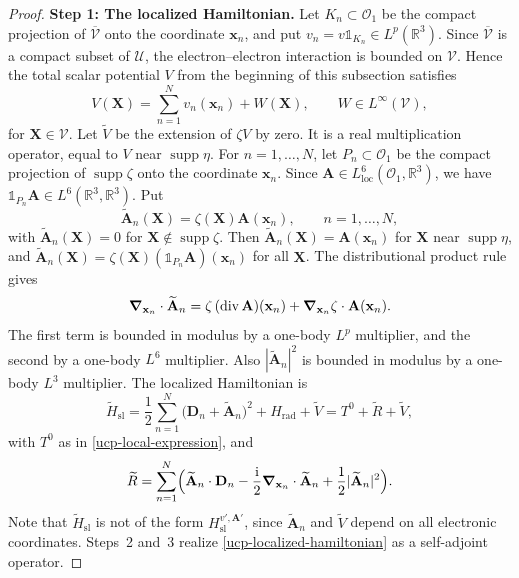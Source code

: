 \documentclass[final,reqno]{amsart}
\DeclareMathOperator{\div}{div}
\DeclareMathOperator{\supp}{supp}
\theoremstyle{remark}
\newcommand{\RR}{\mathbb{R}}
\newcommand{\iden}{\mathbb{1}}
\renewcommand{\i}{\mathrm{i}}
\newcommand{\ol}[1]{\overline{#1}}
\newcommand{\rad}{\mathrm{rad}}
\newcommand{\vx}{\mathbf{x}}
\newcommand{\vA}{{\mathbf{A}}}
\newcommand{\vX}{{\mathbf{X}}}
\newcommand{\vD}{{\mathbf{D}}}
\begin{document}
\begin{proof}
\noindent\textbf{Step 1: The localized Hamiltonian.}
Let $K_n\subset\mathcal O_1$ be the compact projection of
$\ol{\mathcal V}$ onto the coordinate $\vx_n$, and put
$v_n=v\iden_{K_n}\in L^p(\RR^3)$.  Since $\ol{\mathcal V}$ is a compact
subset of $\mathcal U$, the electron--electron interaction is bounded
on $\mathcal V$.  Hence the total scalar potential $V$ from the
beginning of this subsection satisfies
\begin{equation*}
 V(\vX)=\sum_{n=1}^N v_n(\vx_n)+W(\vX),\qquad
 W\in L^\infty(\mathcal V),
\end{equation*}
for $\vX\in\mathcal V$.  Let $\widetilde V$ be the extension of
$\zeta V$ by zero.  It is a real multiplication operator, equal to $V$
near $\supp\eta$.  For
$n=1,\ldots,N$, let $P_n\subset\mathcal O_1$ be the compact projection
of $\supp\zeta$ onto the coordinate $\vx_n$.  Since
$\vA\in L^6_\mathrm{loc}(\mathcal O_1,\RR^3)$, we have
$\iden_{P_n}\vA\in L^6(\RR^3,\RR^3)$.  Put
\[
 \widetilde\vA_n(\vX)=\zeta(\vX)\vA(\vx_n),\qquad n=1,\ldots,N,
\]
with $\widetilde\vA_n(\vX)=0$ for $\vX\notin\supp\zeta$.  Then
$\widetilde\vA_n(\vX)=\vA(\vx_n)$ for $\vX$ near $\supp\eta$, and
$\widetilde\vA_n(\vX)=\zeta(\vX)(\iden_{P_n}\vA)(\vx_n)$ for all $\vX$.  The
distributional product rule gives
\[
 \grad_{\vx_n}\cdot\widetilde\vA_n
 =\zeta\,(\div\vA)(\vx_n)+\grad_{\vx_n}\zeta\cdot\vA(\vx_n).
\]
The first term is bounded in modulus by a one-body $L^p$ multiplier,
and the second by a one-body $L^6$ multiplier.  Also
$|\widetilde\vA_n|^2$ is bounded in modulus by a one-body $L^3$
multiplier.  The localized Hamiltonian is
\begin{equation}\label{ucp-localized-hamiltonian}
 \widetilde H_{\mathrm{sl}}
 =\frac12\sum_{n=1}^N\bigl(\vD_n+\widetilde\vA_n\bigr)^2+H_\rad+\widetilde V
 =T^0+\widetilde R+\widetilde V,
\end{equation}
with $T^0$ as in \cref{ucp-local-expression}, and
\[
 \widetilde R
 =\sum_{n=1}^N\Bigl(\widetilde\vA_n\cdot\vD_n
   -\frac{\i}{2}\grad_{\vx_n}\cdot\widetilde\vA_n
   +\frac12|\widetilde\vA_n|^2\Bigr).
\]
Note that $\widetilde H_{\mathrm{sl}}$ is not of the form
$H_{\mathrm{sl}}^{v',\vA'}$, since
$\widetilde\vA_n$ and $\widetilde V$ depend on all electronic coordinates.
Steps~2 and~3 realize \cref{ucp-localized-hamiltonian} as a
self-adjoint operator.


\end{proof}
\end{document}
